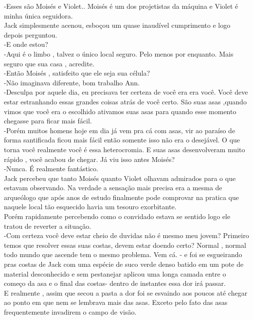 \documentclass{book}
\begin{document}
 -Esses são Moisés e Violet.. Moisés é um dos projetistas da máquina e Violet é minha única seguidora. \\
 Jack simplesmente acenou, esboçou um quase inaudível cumprimento e logo depois perguntou.\\
 -E onde estou?\\
 -Aqui é o limbo , talvez o único local seguro. Pelo menos por enquanto. Mais seguro que sua casa , acredite. \\
 -Então Moisés , satisfeito que ele seja sua célula?\\
 -Não imaginava diferente, bom trabalho Ann.\\
 -Desculpa por aquele dia, eu precisava ter certeza de você era era você. Você deve estar estranhando essas grandes coisas atrás de você certo. São suas asas ,quando vimos que você era o escolhido ativamos suas asas para quando esse momento chegasse para ficar mais fácil.\\
 -Porém muitos homens hoje em dia já vem pra cá com asas, vir ao paraíso de forma santificada ficou mais fácil então somente isso não era o desejável. O que torna você realmente você é essa heterocromia. E suas asas desenvolveram muito rápido , você acabou de chegar. Já viu isso antes Moisés?\\
 -Nunca. É realmente fantástico.\\
 Jack percebeu que tanto Moisés quanto Violet olhavam admirados para o que estavam observando. Na verdade a sensação mais precisa era a mesma de arqueólogo que após anos de estudo finalmente pode comprovar na pratica que naquele local tão esquecido havia um tesouro exorbitante.\\
 Porém rapidamente percebendo como o convidado estava se sentido logo ele tratou de reverter a situação.\\
 -Com certeza você deve estar cheio de duvidas não é mesmo meu jovem? Primeiro temos que resolver essas suas costas, devem estar doendo certo? Normal , normal todo mundo que ascende tem o mesmo problema. Vem cá. - e foi se esgueirando pras costas de Jack com uma espécie de suco verde denso batido em um pote de material desconhecido e sem pestanejar aplicou uma longa camada entre o começo da asa e o final das costas- dentro de instantes essa dor irá passar.\\
 E realmente , assim que secou a pasta a dor foi se esvaindo aos poucos até chegar ao ponto em que nem se lembrava mais das asas. Exceto pelo fato das asas frequentemente invadirem o campo de visão.\\
\end{document}
